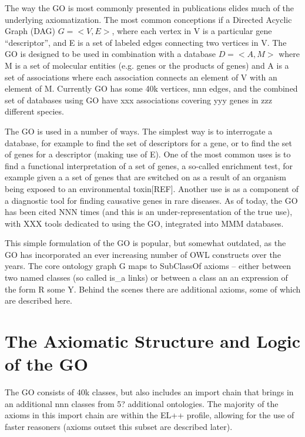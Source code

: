 \documentclass{llncs}
\begin{document}
The way the GO is most commonly presented in publications elides much
of the underlying axiomatization. The most common conceptions if a
Directed Acyclic Graph (DAG) $G = <V,E>$, where each vertex in V is a
particular gene ``descriptor'', and E is a set of labeled edges connecting
two vertices in V. The GO is designed to be used in combination with a
database $D = <A, M>$ where M is a set of molecular entities
(e.g. genes or the products of genes) and A is a set of associations
where each association connects an element of V with an element of
M. Currently GO has some 40k vertices, nnn edges, and the combined set
of databases using GO have xxx associations covering yyy genes in zzz
different species\cite{Blake2013}.

The GO is used in a number of ways. The simplest way is to interrogate
a database, for example to find the set of descriptors for a gene, or
to find the set of genes for a descriptor (making use of E). One of
the most common uses is to find a functional interpretation of a set
of genes, a so-called enrichment test, for example given a a set of
genes that are switched on as a result of an organism being exposed to
an environmental toxin[REF]. Another use is as a component of a
diagnostic tool for finding causative genes in rare
diseases\cite{Phevor}. As of today, the GO has been cited NNN times
(and this is an under-representation of the true use), with XXX tools
dedicated to using the GO, integrated into MMM databases.

This simple formulation of the GO is popular, but somewhat outdated,  %
as the GO has incorporated an ever increasing number of OWL constructs
over the years. The core ontology graph G maps to SubClassOf axioms --
either between two named classes (so called is\_a links) or between a
class an an expression of the form R some Y. Behind the scenes there
are additional axioms, some of which are described here.

\section{The Axiomatic Structure and Logic of the GO}

The GO consists of 40k classes, but also includes an import chain that brings in an additional nnn classes from 5? additional ontologies. The majority of the axioms in this import chain are within the EL++ profile, allowing for the use of faster reasoners (axioms outset this subset are described later).
\end{document}

